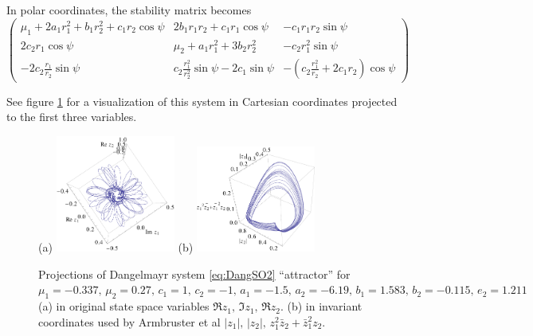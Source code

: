 \documentclass{article}
\begin{document}
In polar coordinates, the stability matrix becomes
\begin{equation}
\left(\begin{array}{ccc}
\mu_1+2a_1r_1^2+b_1r_2^2+c_1r_2\cos\psi & 2b_1r_1r_2+c_1r_1\cos\psi & -c_1r_1r_2\sin\psi\\
2c_2r_1\cos\psi & \mu_2+a_1r_1^2+3b_2r_2^2 & -c_2r_1^2\sin\psi\\
-2c_2\frac{r_1}{r_2}\sin\psi & c_2\frac{r_1^2}{r_2^2}\sin\psi-2c_1\sin\psi & -(c_2\frac{r_1^2}{r_2}+2c_1r_2)\cos\psi
\end{array}\right)
\end{equation}



See figure \ref{fig:dangelmayrChaos} for a visualization of this system in Cartesian coordinates projected to the first three variables.
\begin{figure}
\centering
 (a) \includegraphics[width=0.35\textwidth]{dangelmayrZ}
 (b) \includegraphics[width=0.35\textwidth]{dangelmayrAGH}
\caption{Projections of Dangelmayr system \ref{eq:DangSO2}
``attractor'' for $\mu_1 = -0.337,\, \mu_2 = 0.27,\, c_1 = 1,\, c_2 =
-1,\, a_1 = -1.5,\, a_2 = -6.19,\, b_1 = 1.583,\,  b_2 = -0.115,\, e_2 =
1.211$
(a) in original state space variables $\Re z_1,\,\Im z_1,\,\Re z_2$.
(b) in invariant coordinates used by
Armbruster et al \cite{AGHO288} $|z_1|,\, |z_2|,\, z_1^2 \bar{z}_2 + \bar{z}_1^2 z_2$.
}
 \label{fig:dangelmayrChaos}
\end{figure}
\end{document}
